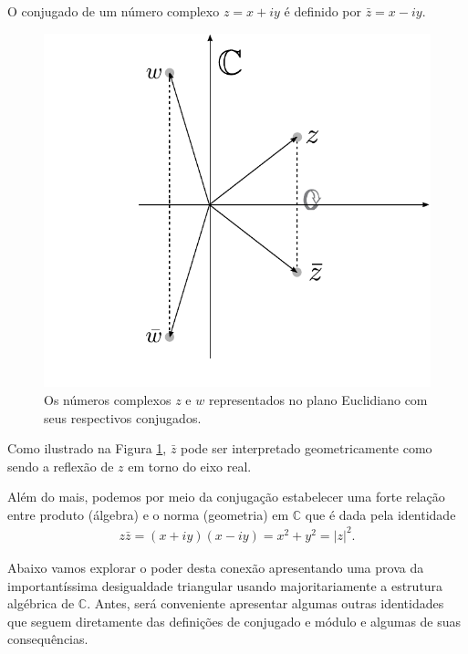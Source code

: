 \begin{definicao}
O conjugado de um número complexo $z=x+iy$ é definido por
$\bar{z}=x-iy$. 
\end{definicao}
\begin{figure}[h]
\centering
\vspace*{-0.4cm}
\includegraphics[scale=0.55]{"./Figuras/fig-conjugado-enquadrado"}
\caption{Os números complexos $z$ e $w$ representados no plano Euclidiano com seus respectivos conjugados.}
\label{fig:conjugado}
\end{figure}

Como ilustrado na Figura \ref{fig:conjugado}, $\bar{z}$ 
pode ser interpretado geometricamente como sendo a reflexão de $z$ em torno
do eixo real. 


Além do mais, podemos por meio da conjugação estabelecer uma forte relação entre produto (álgebra)
e o norma (geometria) em $\mathbb{C}$ que é dada pela identidade
\begin{align}\label{eq-zXzbarra}
z \bar{z} = (x+iy)(x-iy)=x^2+y^2 = |z|^2.
\end{align}


Abaixo vamos explorar o poder desta conexão apresentando uma prova da importantíssima
desigualdade triangular usando majoritariamente a estrutura algébrica de $\mathbb{C}$.
Antes, será conveniente apresentar algumas outras identidades que seguem diretamente
das definições de conjugado e módulo e algumas de suas consequências. 

